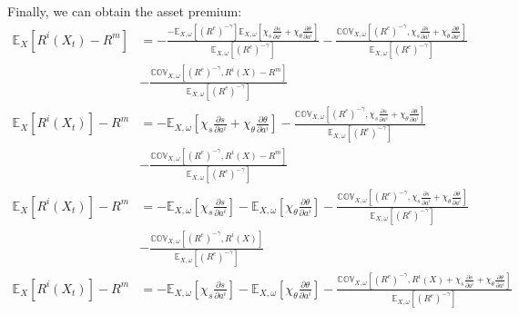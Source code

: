 {\small Finally, we can obtain the asset premium:}
\begin{align*}
\mathbb{E}_{X}\left[R^{i}\left(X_{t}\right)-R^{m}\right] & =-\frac{-\mathbb{E}_{X,\omega}\left[\left(R^{e}\right)^{-\gamma}\right]\mathbb{E}_{X,\omega}\left[\chi_{s}\frac{\partial s}{\partial a^{i}}+\chi_{\theta}\frac{\partial\theta}{\partial a^{i}}\right]}{\mathbb{E}_{X,\omega}\left[\left(R^{e}\right)^{-\gamma}\right]}-\frac{\mathbb{COV}_{X,\omega}\left[\left(R^{e}\right)^{-\gamma},\chi_{s}\frac{\partial s}{\partial a^{i}}+\chi_{\theta}\frac{\partial\theta}{\partial a^{i}}\right]}{\mathbb{E}_{X,\omega}\left[\left(R^{e}\right)^{-\gamma}\right]}\\
 & -\frac{\mathbb{COV}_{X,\omega}\left[\left(R^{e}\right)^{-\gamma},R^{i}\left(X\right)-R^{m}\right]}{\mathbb{E}_{X,\omega}\left[\left(R^{e}\right)^{-\gamma}\right]}\\
\mathbb{E}_{X}\left[R^{i}\left(X_{t}\right)\right]-R^{m} & =-\mathbb{E}_{X,\omega}\left[\chi_{s}\frac{\partial s}{\partial a^{i}}+\chi_{\theta}\frac{\partial\theta}{\partial a^{i}}\right]-\frac{\mathbb{COV}_{X,\omega}\left[\left(R^{e}\right)^{-\gamma},\chi_{s}\frac{\partial s}{\partial a^{i}}+\chi_{\theta}\frac{\partial\theta}{\partial a^{i}}\right]}{\mathbb{E}_{X,\omega}\left[\left(R^{e}\right)^{-\gamma}\right]}\\
 & -\frac{\mathbb{COV}_{X,\omega}\left[\left(R^{e}\right)^{-\gamma},R^{i}\left(X\right)-R^{m}\right]}{\mathbb{E}_{X,\omega}\left[\left(R^{e}\right)^{-\gamma}\right]}\\
\mathbb{E}_{X}\left[R^{i}\left(X_{t}\right)\right]-R^{m} & =-\mathbb{E}_{X,\omega}\left[\chi_{s}\frac{\partial s}{\partial a^{i}}\right]-\mathbb{E}_{X,\omega}\left[\chi_{\theta}\frac{\partial\theta}{\partial a^{i}}\right]-\frac{\mathbb{COV}_{X,\omega}\left[\left(R^{e}\right)^{-\gamma},\chi_{s}\frac{\partial s}{\partial a^{i}}+\chi_{\theta}\frac{\partial\theta}{\partial a^{i}}\right]}{\mathbb{E}_{X,\omega}\left[\left(R^{e}\right)^{-\gamma}\right]}\\
 & -\frac{\mathbb{COV}_{X,\omega}\left[\left(R^{e}\right)^{-\gamma},R^{i}\left(X\right)\right]}{\mathbb{E}_{X,\omega}\left[\left(R^{e}\right)^{-\gamma}\right]}\\
\mathbb{E}_{X}\left[R^{i}\left(X_{t}\right)\right]-R^{m} & =-\mathbb{E}_{X,\omega}\left[\chi_{s}\frac{\partial s}{\partial a^{i}}\right]-\mathbb{E}_{X,\omega}\left[\chi_{\theta}\frac{\partial\theta}{\partial a^{i}}\right]-\frac{\mathbb{COV}_{X,\omega}\left[\left(R^{e}\right)^{-\gamma},R^{i}\left(X\right)+\chi_{s}\frac{\partial s}{\partial a^{i}}+\chi_{\theta}\frac{\partial\theta}{\partial a^{i}}\right]}{\mathbb{E}_{X,\omega}\left[\left(R^{e}\right)^{-\gamma}\right]}\\

\end{align*}
